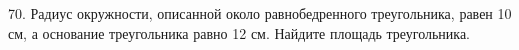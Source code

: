 70. Радиус окружности, описанной около равнобедренного треугольника, равен 10 см, а основание треугольника равно 12 см. Найдите площадь треугольника.\\
